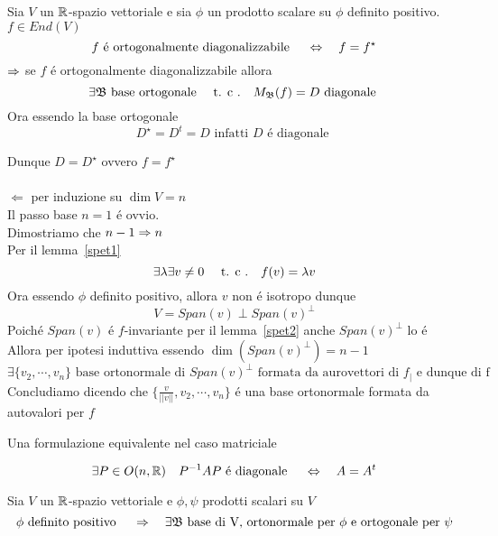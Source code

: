 \spazio
\begin{thm}\bianco
Sia $V$ un $\mathbb{R}$-spazio vettoriale e sia $\phi$ un prodotto scalare su $\phi$ definito positivo.\\
$f \in End(V)$
$$ f \text{ \'e ortogonalmente diagonalizzabile } \quad \Leftrightarrow \quad f = f^\star $$
\proof
$\Rightarrow$ se $f$ \'e ortogonalmente diagonalizzabile allora $$\exists \mathfrak{B} \text{ base ortogonale}  \quad \text{ t. c .} \quad M_{\mathfrak{B}}(f) =D  \text{ diagonale } $$
Ora essendo la base ortogonale $$D^\star = D^t = D \text{ infatti } D \text{ \'e diagonale } $$

Dunque $D=D^\star$ ovvero $f=f^\star $ \\ \\
$\Leftarrow$ per induzione su $\dim V = n $\\
Il passo base $n=1$ \'e ovvio.\\
Dimostriamo che $n-1\Rightarrow n $\\
Per il lemma~\ref{spet1}  $$\exists \lambda \exists v \neq 0 \quad \text{ t. c .} \quad f(v) = \lambda v$$
Ora essendo $\phi$ definito positivo, allora $v$ non \'e isotropo dunque 
$$ V = Span(v) \perp Span(v)^\perp $$
Poich\'e $Span(v)$ \'e $f$-invariante per il lemma~\ref{spet2} anche $Span(v)^\perp$ lo \'e\\
Allora per ipotesi induttiva essendo 
$ \dim \left( Span(v)^\perp \right)=n-1$ 
$$ \exists \{v_2, \cdots , v_n\} \text{ base ortonormale di } Span(v)^\perp \text{ formata da aurovettori di } f_\vert \text { e dunque di f }$$
Concludiamo dicendo che $ \{ \frac{v}{\vert \vert v \vert \vert }, v_2 , \cdots , v_n \} $ \'e una base ortonormale formata da autovalori per $f$  \\
\endproof
\end{thm}
Una formulazione equivalente nel caso matriciale 
\begin{thm}
$$ \exists P \in O(n, \mathbb{R}) \quad P^{-1} A P \text{ \'e diagonale } \quad \Leftrightarrow \quad A = A^t$$
\end{thm}

\newpage
\begin{thm}\bianco
Sia $V$ un $\mathbb{R}$-spazio vettoriale e $\phi, \psi $ prodotti scalari su $V$
$$ \phi \text{ definito positivo } \quad \Rightarrow \quad \exists \mathfrak{B} \text{ base di V, ortonormale per } \phi \text{ e ortogonale per } \psi$$
\end{thm}


